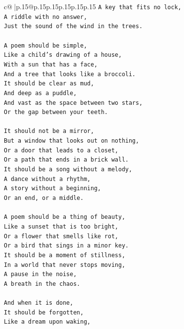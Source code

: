 \documentclass{article}
\begin{document}
{\begin{supertabular}{c@{$\;$}|p{.15\linewidth}@{}p{.15\linewidth}p{.15\linewidth}p{.15\linewidth}p{.15\linewidth}p{.15\linewidth}}
{{{\texttt{A key that fits no lock,} \\
\texttt{A riddle with no answer,} \\
\texttt{Just the sound of the wind in the trees.} \\
\\ 
\texttt{A poem should be simple,} \\
\texttt{Like a child's drawing of a house,} \\
\texttt{With a sun that has a face,} \\
\texttt{And a tree that looks like a broccoli.} \\
\texttt{It should be clear as mud,} \\
\texttt{And deep as a puddle,} \\
\texttt{And vast as the space between two stars,} \\
\texttt{Or the gap between your teeth.} \\
\\ 
\texttt{It should not be a mirror,} \\
\texttt{But a window that looks out on nothing,} \\
\texttt{Or a door that leads to a closet,} \\
\texttt{Or a path that ends in a brick wall.} \\
\texttt{It should be a song without a melody,} \\
\texttt{A dance without a rhythm,} \\
\texttt{A story without a beginning,} \\
\texttt{Or an end, or a middle.} \\
\\ 
\texttt{A poem should be a thing of beauty,} \\
\texttt{Like a sunset that is too bright,} \\
\texttt{Or a flower that smells like rot,} \\
\texttt{Or a bird that sings in a minor key.} \\
\texttt{It should be a moment of stillness,} \\
\texttt{In a world that never stops moving,} \\
\texttt{A pause in the noise,} \\
\texttt{A breath in the chaos.} \\
\\ 
\texttt{And when it is done,} \\
\texttt{It should be forgotten,} \\
\texttt{Like a dream upon waking,} \\
}}}
\end{supertabular}}
\end{document}
